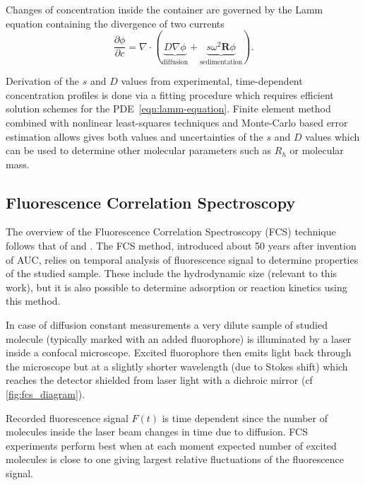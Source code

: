 \documentclass{doctoral}
\newcommand{\pd}{\partial}
\begin{document}
Changes of concentration inside the container are governed by the Lamm equation containing the divergence of two currents
\begin{equation}
    \frac{\pd \phi}{\pd c} = \nabla \cdot \left( \underbrace{D \nabla \phi}_\text{diffusion} + \underbrace{s \omega^2 \bm{R} \phi}_\text{sedimentation} \right).
    \label{eqn:lamm-equation}
\end{equation}

Derivation of the $s$ and $D$ values from experimental, time-dependent concentration profiles is done via a fitting procedure which requires efficient solution schemes for the PDE~\eqref{eqn:lamm-equation}\cite{Demeler_2016,Cao_2005}.
Finite element method combined with nonlinear least-squares techniques and Monte-Carlo based error estimation allows gives both values and uncertainties of the $s$ and $D$ values which can be used to determine other molecular parameters such as $R_h$ or molecular mass.

\subsection{Fluorescence Correlation Spectroscopy}
\label{sec:FCS}

The overview of the Fluorescence Correlation Spectroscopy (FCS) technique follows that of \textcite{Tompson_2002} and \textcite{Gregor_2008}.
The FCS method, introduced about 50 years after invention of AUC, relies on temporal analysis of fluorescence signal to determine properties of the studied sample.
These include the hydrodynamic size (relevant to this work), but it is also possible to determine adsorption or reaction kinetics using this method.

In case of diffusion constant measurements a very dilute sample of studied molecule (typically marked with an added fluorophore) is illuminated by a laser inside a confocal microscope.
Excited fluorophore then emits light back through the microscope but at a slightly shorter wavelength (due to Stokes shift) which reaches the detector shielded from laser light with a dichroic mirror (cf \ref{fig:fcs_diagram}).

Recorded fluorescence signal $F(t)$ is time dependent since the number of molecules inside the laser beam changes in time due to diffusion.
FCS experiments perform best when at each moment expected number of excited molecules is close to one giving largest relative fluctuations of the fluorescence signal.
\end{document}
